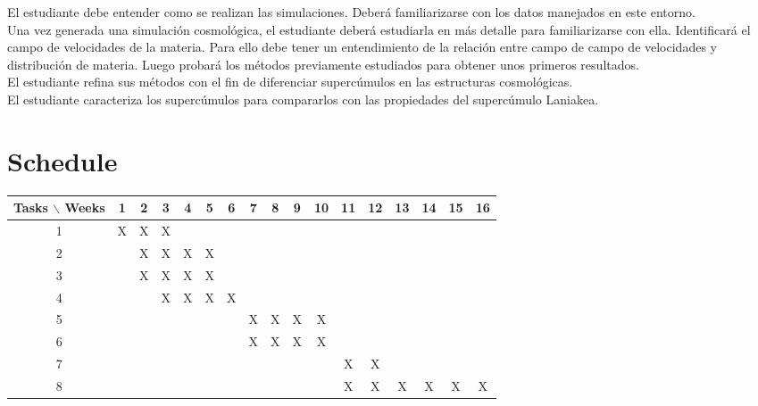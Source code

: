 \documentclass[12pt]{article}
\begin{document}
El estudiante debe entender como se realizan las
simulaciones. Deber\'{a} familiarizarse con los datos manejados en
este entorno.  
\\
Una vez generada una simulaci\'on cosmol\'{o}gica, el estudiante
deber\'{a} estudiarla en m\'{a}s detalle para familiarizarse con
ella. Identificar\'{a} el campo de velocidades de la materia. Para ello debe tener un entendimiento de la relaci\'{o}n entre campo de campo de velocidades y distribuci\'{o}n de materia.
Luego probar\'{a} los m\'{e}todos previamente estudiados para obtener unos
primeros resultados.  
\\

El estudiante refina sus m\'{e}todos con el fin de diferenciar
superc\'{u}mulos en las estructuras cosmol\'{o}gicas. 
\\

El estudiante caracteriza los superc\'umulos para compararlos con las
propiedades del superc\'umulo Laniakea.

\section{Schedule}

\begin{table}[htb]
	\begin{tabular}{|c|cccccccccccccccc| }
	\hline
	Tasks $\backslash$ Weeks & 1 & 2 & 3 & 4 & 5 & 6 & 7 & 8 & 9 & 10 & 11 & 12 & 13 & 14 & 15 & 16  \\
	\hline
	1 & X & X & X &   &   &   &   &   &   &   &   &   &   &   &   &   \\
	2 &   & X & X & X & X &   &   &   &   &   &   &   &   &   &   &   \\
	3 &   & X & X & X & X &   &   &   &   &   &   &   &   &   &   &   \\
	4 &   &   & X & X & X & X &   &   &   &   &   &   &   &   &   &   \\
	5 &   &   &   &   &   &   & X & X & X & X &   &   &   &   &   &   \\
	6 &   &   &   &   &   &   & X & X & X & X &   &   &   &   &   &   \\
	7 &   &   &   &   &   &   &   &   &   &   & X & X &   &   &   &   \\
	8 &   &   &   &   &   &   &   &   &   &   & X & X & X & X & X & X \\
	\hline
	\end{tabular}
\end{table}
\vspace{1mm}
\end{document}
